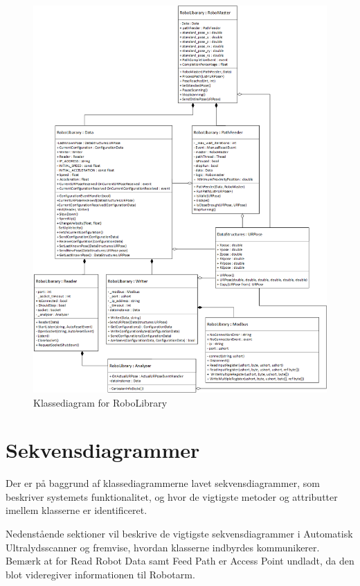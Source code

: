 {\begin{figure}[H]
    \centering
    \includegraphics[width=1\textwidth]{figurer/d/Design/Class/uml_class_robolibrary}
    \caption{Klassediagram for RoboLibrary}
    \label{class_RoboLib}
\end{figure}
\newpage

\section{Sekvensdiagrammer}
Der er på baggrund af klassediagrammerne lavet sekvensdiagrammer, som beskriver systemets funktionalitet, og hvor de vigtigste metoder og attributter imellem klasserne er identificeret.

Nedenstående sektioner vil beskrive de vigtigste sekvensdiagrammer i Automatisk Ultralydsscanner og fremvise, hvordan klasserne indbyrdes kommunikerer. 
Bemærk at for Read Robot Data samt Feed Path er Access Point undladt, da den blot videregiver informationen til Robotarm.

}
